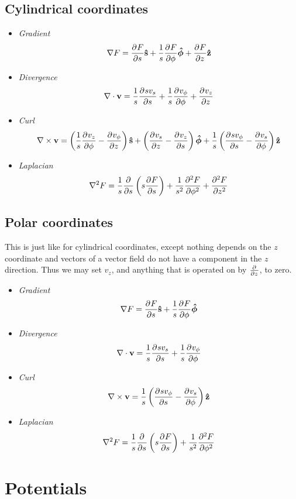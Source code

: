 \subsection{Cylindrical coordinates}
\begin{itemize}
\item \textit{Gradient}
\[ \grad F = \pd{F}{s}\vhat{s} + \frac{1}{s} \pd{F}{\phi}\vhat{\phi} + \pd{F}{z}\vhat{z} \]
\item \textit{Divergence}
\[ \nabla\cdot \vec{v} = \frac{1}{s}\pd{sv_s}{s} + \frac{1}{s}\pd{v_\phi}{\phi} + \pd{v_z}{z} \]
\item \textit{Curl}
\[ \curl \vec{v} = \left(\frac{1}{s}\pd{v_z}{\phi} - \pd{v_\phi}{z}\right)\vhat{s} + \left(\pd{v_s}{z} - \pd{v_z}{s}\right)\vhat{\phi} + \frac{1}{s}\left(\pd{sv_\phi}{s} - \pd{v_s}{\phi}\right)\vhat{z}  \]
\item \textit{Laplacian}
\[ \nabla^2 F = \frac{1}{s} \pd{}{s}\left(s \pd{F}{s}\right) + \frac{1}{s^2} \pd[2]{F}{\phi} + \pd[2]{F}{z} \]
\end{itemize}
\subsection{Polar coordinates}
This is just like for cylindrical coordinates, except nothing depends on the $z$ coordinate and vectors of a vector field do not have a component in the $z$ direction. Thus we may set $v_z$, and anything that is operated on by $\pd{}{z}$, to zero.
\begin{itemize}
\item \textit{Gradient}
\[ \grad F = \pd{F}{s}\vhat{s} + \frac{1}{s} \pd{F}{\phi}\vhat{\phi} \]
\item \textit{Divergence}
\[ \nabla\cdot \vec{v} = \frac{1}{s}\pd{sv_s}{s} + \frac{1}{s}\pd{v_\phi}{\phi} \]
\item \textit{Curl}
\[ \curl \vec{v} = \frac{1}{s}\left(\pd{sv_\phi}{s} - \pd{v_s}{\phi}\right)\vhat{z}  \]
\item \textit{Laplacian}
\[ \nabla^2 F = \frac{1}{s} \pd{}{s}\left(s \pd{F}{s}\right) + \frac{1}{s^2} \pd[2]{F}{\phi} \]
\end{itemize}

\section{Potentials}
